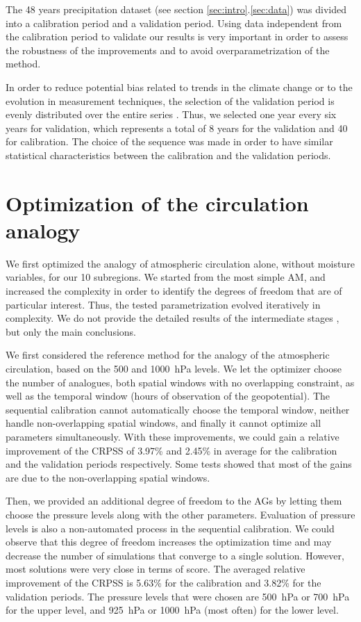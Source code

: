 \documentclass[5p]{elsarticle}
\begin{document}
The 48 years precipitation dataset (see section \ref{sec:intro}.\ref{sec:data}) was divided into a calibration period and a validation period. Using data independent from the calibration period to validate our results is very important in order to assess the robustness of the improvements and to avoid overparametrization of the method.

In order to reduce potential bias related to trends in the climate change or to the evolution in measurement techniques, the selection of the validation period is evenly distributed over the entire series \citep{BenDaoud2010}. Thus, we selected one year every six years for validation, which represents a total of 8 years for the validation and 40 for calibration. The choice of the sequence was made in order to have similar statistical characteristics between the calibration and the validation periods.


\section{Optimization of the circulation analogy}
\label{sec:optim_circul}

We first optimized the analogy of atmospheric circulation alone, without moisture variables, for our 10 subregions. We started from the most simple AM, and increased the complexity in order to identify the degrees of freedom that are of particular interest. Thus, the tested parametrization evolved iteratively in complexity. We do not provide the detailed results of the intermediate stages \citep[see][for the details]{Horton2012a}, but only the main conclusions.

We first considered the reference method for the analogy of the atmospheric circulation, based on the 500 and 1000~hPa levels. We let the optimizer choose the number of analogues, both spatial windows with no overlapping constraint, as well as the temporal window (hours of observation of the geopotential). The sequential calibration cannot automatically choose the temporal window, neither handle non-overlapping spatial windows, and finally it cannot optimize all parameters simultaneously. With these improvements, we could gain a relative improvement of the CRPSS of 3.97\% and 2.45\% in average for the calibration and the validation periods respectively. Some tests showed that most of the gains are due to the non-overlapping spatial windows.

Then, we provided an additional degree of freedom to the AGs by letting them choose the pressure levels along with the other parameters. Evaluation of pressure levels is also a non-automated process in the sequential calibration. We could observe that this degree of freedom increases the optimization time and may decrease the number of simulations that converge to a single solution. However, most solutions were very close in terms of score. The averaged relative improvement of the CRPSS is 5.63\% for the calibration and 3.82\% for the validation periods. The pressure levels that were chosen are 500~hPa or 700~hPa for the upper level, and 925~hPa or 1000~hPa (most often) for the lower level.
\end{document}
